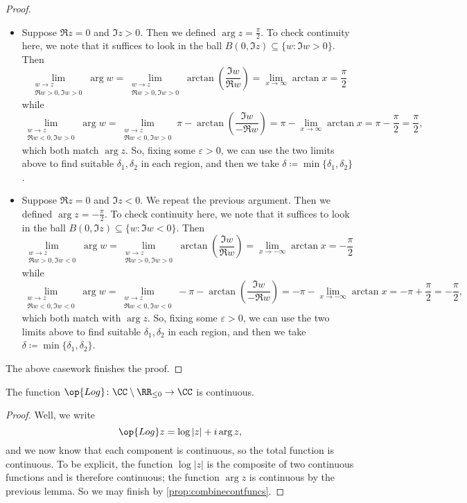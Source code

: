 \documentclass[../notes.tex]{subfiles}
\begin{document}
\begin{proof}
\begin{itemize}
		\item Suppose $\Re z=0$ and $\Im z>0$. Then we defined $\arg z=\frac\pi2$. To check continuity here, we note that it suffices to look in the ball $B(0,\Im z)\subseteq\{w:\Im w>0\}$. Then
		\[\lim_{\substack{w\to z\\\Re w>0,\Im w>0}}\arg w=\lim_{\substack{w\to z\\\Re w>0,\Im w>0}}\arctan\left(\frac{\Im w}{\Re w}\right)=\lim_{x\to\infty}\arctan x=\frac\pi2\]
		while
		\[\lim_{\substack{w\to z\\\Re w<0,\Im w>0}}\arg w=\lim_{\substack{w\to z\\\Re w<0,\Im w>0}}\pi-\arctan\left(\frac{\Im w}{-\Re w}\right)=\pi-\lim_{x\to\infty}\arctan x=\pi-\frac\pi2=\frac\pi2,\]
		which both match $\arg z$. So, fixing some $\varepsilon>0$, we can use the two limits above to find suitable $\delta_1,\delta_2$ in each region, and then we take $\delta\coloneqq \min\{\delta_1,\delta_2\}$.
		\item Suppose $\Re z=0$ and $\Im z<0$. We repeat the previous argument. Then we defined $\arg z=-\frac\pi2$. To check continuity here, we note that it suffices to look in the ball $B(0,\Im z)\subseteq\{w:\Im w<0\}$. Then
		\[\lim_{\substack{w\to z\\\Re w>0,\Im w<0}}\arg w=\lim_{\substack{w\to z\\\Re w>0,\Im w>0}}\arctan\left(\frac{\Im w}{\Re w}\right)=\lim_{x\to-\infty}\arctan x=-\frac\pi2\]
		while
		\[\lim_{\substack{w\to z\\\Re w<0,\Im w<0}}\arg w=\lim_{\substack{w\to z\\\Re w<0,\Im w<0}}-\pi-\arctan\left(\frac{\Im w}{-\Re w}\right)=-\pi-\lim_{x\to-\infty}\arctan x=-\pi+\frac\pi2=-\frac\pi2,\]
		which both match with $\arg z$. So, fixing some $\varepsilon>0$, we can use the two limits above to find suitable $\delta_1,\delta_2$ in each region, and then we take $\delta\coloneqq \min\{\delta_1,\delta_2\}$.
	\end{itemize}
	The above casework finishes the proof.
\end{proof}
\begin{corollary} \label{cor:logcont}
	The function $\op{Log}\colon \CC\setminus\RR_{\le0}\to\CC$ is continuous.
\end{corollary}
\begin{proof}
	Well, we write
	\[\op{Log}z=\log|z|+i\arg z,\]
	and we now know that each component is continuous, so the total function is continuous. To be explicit, the function $\log|z|$ is the composite of two continuous functions and is therefore continuous; the function $\arg z$ is continuous by the previous lemma. So we may finish by \autoref{prop:combinecontfuncs}.
\end{proof}
\end{document}
